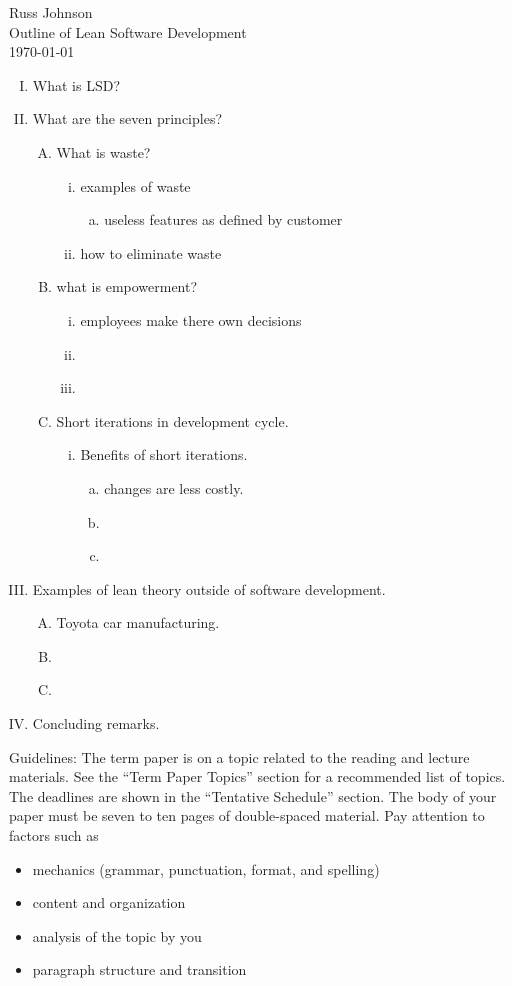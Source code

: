 \documentclass[11pt,a4paper]{article}
\begin{document}
\begin{flushright}
Russ Johnson\\
Outline of Lean Software Development\\
\today\\
\end{flushright}
\begin{enumerate}[I.]
\item What is LSD?
\item What are the seven principles?
\begin{enumerate}[A.]
\item What is waste?
\begin{enumerate}[i.]
\item examples of waste
\begin{enumerate}[a.]
\item useless features as defined by customer
\end{enumerate}
\item how to eliminate waste
\end{enumerate}
\item what is empowerment?
\begin{enumerate}[i.]
\item employees make there own decisions
\item ~
\item ~
\end{enumerate}
\item Short iterations in development cycle.
\begin{enumerate}[i.]
\item Benefits of short iterations.
\begin{enumerate}[a.]
\item changes are less costly.
\item ~
\item ~
\end{enumerate}
\end{enumerate}
\end{enumerate}
\item Examples of lean theory outside of software development.
\begin{enumerate}[A.]
\item Toyota car manufacturing.
\item ~
\item ~
\end{enumerate}
\item Concluding remarks.
\end{enumerate}


Guidelines:
The term paper is on a topic related to the reading and lecture materials. See the ``Term Paper
Topics'' section for a recommended list of topics. The deadlines are shown in the ``Tentative
Schedule'' section. The body of your paper must be seven to ten pages of double-spaced material.
Pay attention to factors such as
\begin{itemize}
\item mechanics (grammar, punctuation, format, and spelling)
\item content and organization
\item analysis of the topic by you
\item paragraph structure and transition
\end{itemize}
\end{document}
